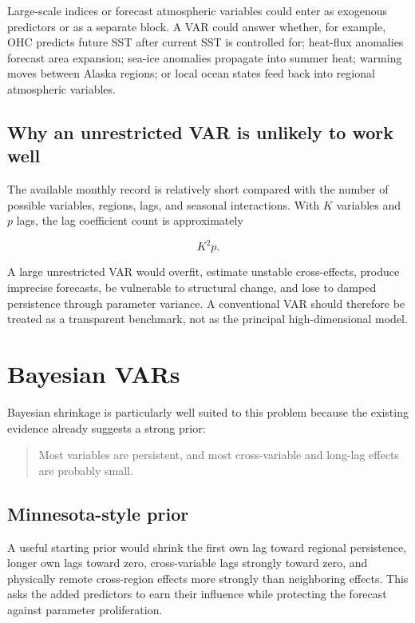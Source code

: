 \documentclass[11pt]{article}
\begin{document}
Large-scale indices or forecast atmospheric variables could enter as exogenous predictors or as a separate block. A VAR could answer whether, for example, OHC predicts future SST after current SST is controlled for; heat-flux anomalies forecast area expansion; sea-ice anomalies propagate into summer heat; warming moves between Alaska regions; or local ocean states feed back into regional atmospheric variables.

\subsection{Why an unrestricted VAR is unlikely to work well}

The available monthly record is relatively short compared with the number of possible variables, regions, lags, and seasonal interactions. With $K$ variables and $p$ lags, the lag coefficient count is approximately

\begin{equation}
K^2p.
\end{equation}

A large unrestricted VAR would overfit, estimate unstable cross-effects, produce imprecise forecasts, be vulnerable to structural change, and lose to damped persistence through parameter variance. A conventional VAR should therefore be treated as a transparent benchmark, not as the principal high-dimensional model.

\section{Bayesian VARs}

Bayesian shrinkage is particularly well suited to this problem because the existing evidence already suggests a strong prior:

\begin{quote}
Most variables are persistent, and most cross-variable and long-lag effects are probably small.
\end{quote}

\subsection{Minnesota-style prior}

A useful starting prior would shrink the first own lag toward regional persistence, longer own lags toward zero, cross-variable lags strongly toward zero, and physically remote cross-region effects more strongly than neighboring effects. This asks the added predictors to earn their influence while protecting the forecast against parameter proliferation.
\end{document}
